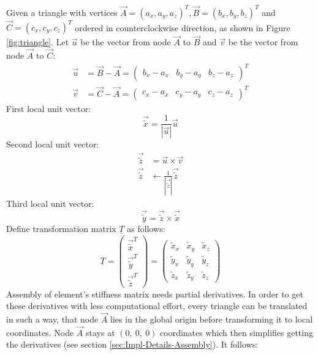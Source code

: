   Given a triangle with vertices $\vec{A} = (a_x, a_y, a_z)^T, \vec{B} = (b_x, b_y, b_z)^T$ and $\vec{C} = (c_x, c_y, c_z)^T$ ordered in counterclockwise direction, as shown in Figure \ref{fig:triangle}. Let $\vec{u}$ be the vector from node $\vec{A}$ to $\vec{B}$ and $\vec{v}$ be the vector from node $\vec{A}$ to $\vec{C}$:
  \begin{align*}
  \vec{u} &= \vec{B}-\vec{A} = \begin{pmatrix}
  b_x - a_x & b_y - a_y & b_z - a_z
  \end{pmatrix}^T\\
  \vec{v} &= \vec{C}-\vec{A} = \begin{pmatrix}
  c_x - a_x & c_y - a_y & c_z - a_z
  \end{pmatrix}^T
  \end{align*}
  First local unit vector:
  \begin{equation*}
   \vec{\tilde{x}} = \frac{1}{\left|\vec{u}\right|}\vec{u}
  \end{equation*}
  Second local unit vector:
  \begin{align*}
   \vec{\tilde{z}} &= \vec{u} \times \vec{v} \\
   \vec{\tilde{z}} &\leftarrow \frac{1}{\left|\vec{\tilde{z}}\right|}\vec{\tilde{z}}
  \end{align*}
  Third local unit vector:
  \begin{equation*}
   \vec{\tilde{y}} = \vec{\tilde{z}} \times \vec{\tilde{x}}
  \end{equation*}
  Define transformation matrix $\underline{T}$ as follows:
  \begin{equation}\label{eq:trafoT_tri}
   \underline{T} = \begin{pmatrix}
   \vec{\tilde{x}}^T\\ \vec{\tilde{y}}^T\\ \vec{\tilde{z}}^T
   \end{pmatrix} = \begin{pmatrix}
   \tilde{x}_x & \tilde{x}_y & \tilde{x}_z\\
   \tilde{y}_x & \tilde{y}_y & \tilde{y}_z\\
   \tilde{z}_x & \tilde{z}_y & \tilde{z}_z
   \end{pmatrix}
  \end{equation}
  Assembly of element's stiffness matrix needs partial derivatives. In order to get these derivatives with less computational effort, every triangle can be translated in such a way, that node $\vec{A}$ lies in the global origin before transforming it to local coordinates. Node $\vec{A}$ stays at $(0,\ 0,\ 0)$ coordinates which then simplifies getting the derivatives (see section \ref{sec:Impl-Details-Assembly}). It follows:
